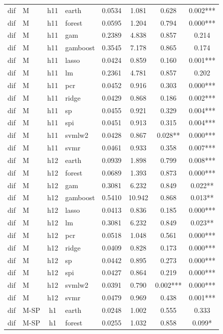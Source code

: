 \begin{ThreePartTable}
\begin{longtable}[t]{llclcccc}
\addlinespace
dif & M & h11 & earth & 0.0534 & 1.081 & 0.628 & 0.002***\\
dif & M & h11 & forest & 0.0595 & 1.204 & 0.794 & 0.000***\\
dif & M & h11 & gam & 0.2389 & 4.838 & 0.857 & 0.214\\
dif & M & h11 & gamboost & 0.3545 & 7.178 & 0.865 & 0.174\\
dif & M & h11 & lasso & 0.0424 & 0.859 & 0.160 & 0.001***\\
dif & M & h11 & lm & 0.2361 & 4.781 & 0.857 & 0.202\\
dif & M & h11 & pcr & 0.0452 & 0.916 & 0.303 & 0.000***\\
dif & M & h11 & ridge & 0.0429 & 0.868 & 0.186 & 0.002***\\
dif & M & h11 & sp & 0.0455 & 0.921 & 0.329 & 0.004***\\
dif & M & h11 & spi & 0.0451 & 0.913 & 0.315 & 0.004***\\
dif & M & h11 & svmlw2 & 0.0428 & 0.867 & 0.028** & 0.000***\\
dif & M & h11 & svmr & 0.0461 & 0.933 & 0.358 & 0.007***\\
\addlinespace
dif & M & h12 & earth & 0.0939 & 1.898 & 0.799 & 0.008***\\
dif & M & h12 & forest & 0.0689 & 1.393 & 0.873 & 0.000***\\
dif & M & h12 & gam & 0.3081 & 6.232 & 0.849 & 0.022**\\
dif & M & h12 & gamboost & 0.5410 & 10.942 & 0.868 & 0.013**\\
dif & M & h12 & lasso & 0.0413 & 0.836 & 0.185 & 0.000***\\
dif & M & h12 & lm & 0.3081 & 6.232 & 0.849 & 0.023**\\
dif & M & h12 & pcr & 0.0518 & 1.048 & 0.561 & 0.000***\\
dif & M & h12 & ridge & 0.0409 & 0.828 & 0.173 & 0.000***\\
dif & M & h12 & sp & 0.0442 & 0.895 & 0.273 & 0.000***\\
dif & M & h12 & spi & 0.0427 & 0.864 & 0.219 & 0.000***\\
dif & M & h12 & svmlw2 & 0.0391 & 0.790 & 0.002*** & 0.000***\\
dif & M & h12 & svmr & 0.0479 & 0.969 & 0.438 & 0.001***\\
\addlinespace
dif & M-SP & h1 & earth & 0.0248 & 1.002 & 0.555 & 0.333\\
dif & M-SP & h1 & forest & 0.0255 & 1.032 & 0.858 & 0.099*\\

\end{longtable}
\end{ThreePartTable}
